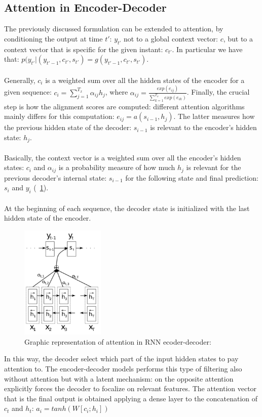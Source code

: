 \documentclass[LaM,binding=0.6cm]{sapthesis}
\begin{document}
\subsection{Attention in Encoder-Decoder}
The previously discussed formulation can be extended to attention, by conditioning the output at time $t'$: $y_{t'}$ not to a global context vector: $c$, but to a context vector that is specific for the given instant: $c_{t'}$. In particular we have that: $p(y_{t'}|(y_{t'-1},c_{t'},s_{t'})=g(y_{t'-1},c_{t'},s_{t'})$.\\\\Generally, $c_{i}$ is a weighted sum over all the hidden states of the encoder for a given sequence: $c_{i} = \sum_{j=1}^{T_x}\alpha_{ij}h_j$, where $\alpha_{ij}=\frac{exp(e_{ij})}{\sum_{k=1}^{T_x}exp(e_{ik})}$. Finally, the crucial step is how the alignment scores are computed: different attention algorithms mainly differs for this computation: $e_{ij}=a(s_{i-1},h_j)$. The latter measures how the previous hidden state of the decoder: $s_{i-1}$ is relevant to the encoder's hidden state: $h_j$.\\\\Basically, the context vector is a weighted sum over all the encoder's hidden states: $c_{i}$ and $\alpha_{ij}$ is a probability measure of how much $h_j$ is relevant for the previous decoder's internal state: $s_{i-1}$ for the following state and final prediction: $s_i$ and $y_i$ (~\ref{fig:encdecatt}).\\\\At the beginning of each sequence, the decoder state is initialized with the last hidden state of the encoder.
\begin{figure}   \centering
    \includegraphics[width=40mm,scale=0.5]{encdecatt}
    \caption{Graphic representation of attention in RNN ecoder-decoder: \cite{psy}}
    \label{fig:encdecatt}
\end{figure}
In this way, the decoder select which part of the input hidden states to pay attention to. The encoder-decoder models performs this type of filtering also without attention but with a latent mechanism: on the opposite attention explicitly forces the decoder to focalize on relevant features. The attention vector that is the final output is obtained applying a dense layer to the concatenation of $c_t$ and $h_t$: $a_i=tanh(W[c_i;h_i])$
\end{document}
